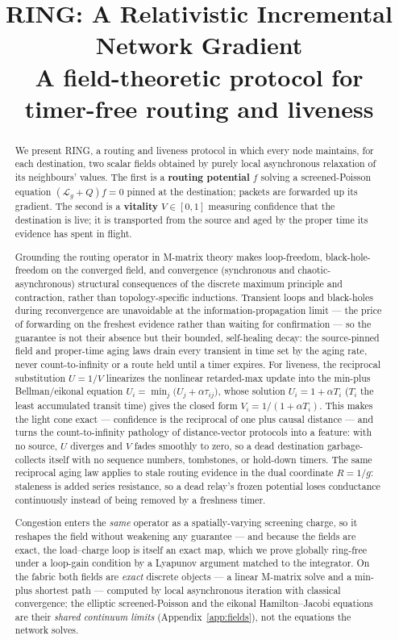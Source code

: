 \documentclass[11pt]{article}
\title{RING: A Relativistic Incremental Network Gradient\\\large A field-theoretic protocol for timer-free routing and liveness}
\author{}
\date{}
\theoremstyle{plain}
\numberwithin{equation}{section}
\begin{document}
\maketitle

\begin{abstract}
We present RING, a routing and liveness protocol in which every node maintains, for each destination, two scalar fields obtained by purely local asynchronous relaxation of its neighbours' values. The first is a \textbf{routing potential} $f$ solving a screened-Poisson equation $(\mathcal{L}_g+Q)f=0$ pinned at the destination; packets are forwarded up its gradient. The second is a \textbf{vitality} $V\in[0,1]$ measuring confidence that the destination is live; it is transported from the source and aged by the proper time its evidence has spent in flight.

Grounding the routing operator in M-matrix theory makes loop-freedom, black-hole-freedom on the converged field, and convergence (synchronous and chaotic-asynchronous) structural consequences of the discrete maximum principle and contraction, rather than topology-specific inductions. Transient loops and black-holes during reconvergence are unavoidable at the information-propagation limit — the price of forwarding on the freshest evidence rather than waiting for confirmation — so the guarantee is not their absence but their bounded, self-healing decay: the source-pinned field and proper-time aging laws drain every transient in time set by the aging rate, never count-to-infinity or a route held until a timer expires. For liveness, the reciprocal substitution $U=1/V$ linearizes the nonlinear retarded-max update into the min-plus Bellman/eikonal equation $U_i=\min_j\!\big(U_j+\alpha\tau_{ij}\big)$, whose solution $U_i=1+\alpha T_i$ ($T_i$ the least accumulated transit time) gives the closed form $V_i=1/(1+\alpha T_i)$. This makes the light cone exact — confidence is the reciprocal of one plus causal distance — and turns the count-to-infinity pathology of distance-vector protocols into a feature: with no source, $U$ diverges and $V$ fades smoothly to zero, so a dead destination garbage-collects itself with no sequence numbers, tombstones, or hold-down timers. The same reciprocal aging law applies to stale routing evidence in the dual coordinate $R=1/g$: staleness is added series resistance, so a dead relay's frozen potential loses conductance continuously instead of being removed by a freshness timer.

Congestion enters the \emph{same} operator as a spatially-varying screening charge, so it reshapes the field without weakening any guarantee — and because the fields are exact, the load–charge loop is itself an exact map, which we prove globally ring-free under a loop-gain condition by a Lyapunov argument matched to the integrator. On the fabric both fields are \emph{exact} discrete objects — a linear M-matrix solve and a min-plus shortest path — computed by local asynchronous iteration with classical convergence; the elliptic screened-Poisson and the eikonal Hamilton–Jacobi equations are their \emph{shared continuum limits} (Appendix~\ref{app:fields}), not the equations the network solves.


\end{abstract}
\end{document}
